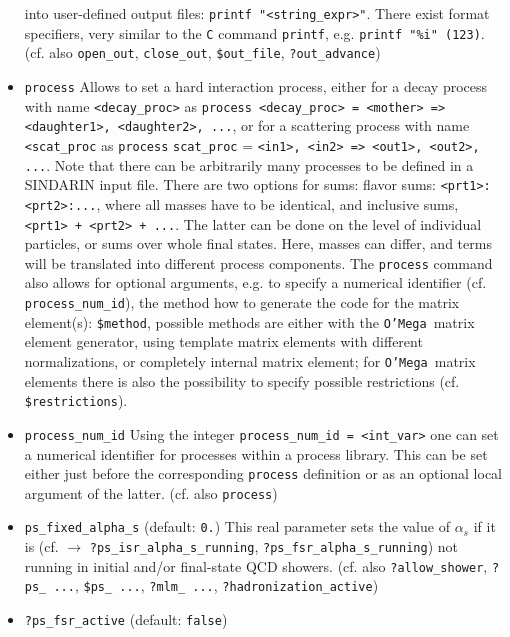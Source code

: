 \documentclass[12pt]{book}
\newcommand{\ttt}[1]{\texttt{#1}}
\newcommand{\oMega}{\texttt{O'Mega}}
\begin{document}
\begin{itemize}
into user-defined output files: \ttt{printf "<string\_expr>"}. There
exist format specifiers, very similar to the \ttt{C} command
\ttt{printf}, e.g. \ttt{printf "\%i" (123)}. (cf. also
\ttt{open\_out}, \ttt{close\_out}, \ttt{\$out\_file},
\ttt{?out\_advance}) 
\item
\ttt{process} \newline
Allows to set a hard interaction process, either for a decay process
with name \ttt{<decay\_proc>} as \ttt{process <decay\_proc> = <mother> 
  => <daughter1>, <daughter2>, ...}, or for a scattering process
with name \ttt{<scat\_proc} as \ttt{process} \ttt{scat\_proc} =
\ttt{<in1>, <in2> => <out1>, <out2>, ...}. Note
that there can be arbitrarily many processes to be defined in a  
SINDARIN input file. There are two options for sums: flavor sums:
\ttt{<prt1>:<prt2>:...}, where all masses have to be identical, and
inclusive sums, \ttt{<prt1> + <prt2> + ...}. The latter can be done on
the level of individual particles, or sums over whole final
states. Here, masses can differ, and terms will be translated into
different process components. The \ttt{process} command also allows for
optional arguments, e.g. to specify a numerical identifier 
(cf. \ttt{process\_num\_id}), the method how to generate the code for
the matrix element(s): \ttt{\$method}, possible methods are either
with the \oMega\ matrix element generator, using template matrix
elements with different normalizations, or completely internal matrix
element; for \oMega\ matrix elements there is also the possibility to
specify possible restrictions (cf. \ttt{\$restrictions}).
\item
\ttt{process\_num\_id} \newline
Using the integer \ttt{process\_num\_id = <int\_var>} one can set a
numerical identifier for processes within a process library. This can
be set either just before the corresponding \ttt{process} definition
or as an optional local argument of the latter. (cf. also \ttt{process})
\item
\ttt{ps\_fixed\_alpha\_s} \qquad (default: \ttt{0.}) \newline
This real parameter sets the value of $\alpha_s$ if it is (cf. $\to$
\ttt{?ps\_isr\_alpha\_s\_running}, \newline \ttt{?ps\_fsr\_alpha\_s\_running})
not running in initial and/or final-state QCD showers.  (cf. also
\ttt{?allow\_shower}, \ttt{?ps\_ ...}, \ttt{\$ps\_ ...}, \ttt{?mlm\_
...}, \ttt{?hadronization\_active})  
\item
\ttt{?ps\_fsr\_active} \qquad (default: \ttt{false}) \newline

\end{itemize}
\end{document}
